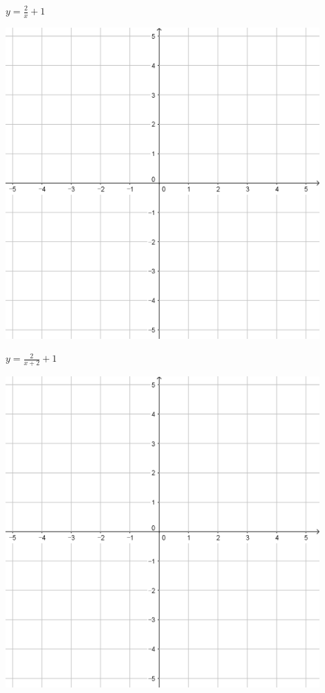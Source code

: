 \documentclass[a4paper]{oblivoir}
\begin{document}
\begin{minipage}{0.45\textwidth}\centering
\(y=\frac2x+1\)
\par\bigskip\includegraphics[width=0.9\textwidth]{55}
\end{minipage}
\begin{minipage}{0.45\textwidth}\centering
\(y=\frac2{x+2}+1\)
\par\bigskip\includegraphics[width=0.9\textwidth]{55}
\end{minipage}\bigskip\bigskip\par
\end{document}
